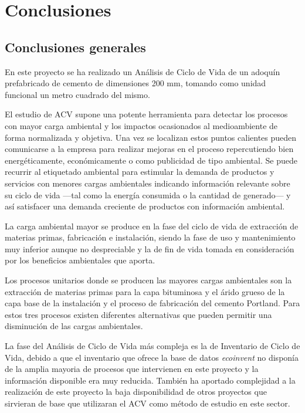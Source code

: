 \chapter{Conclusiones}\label{cap:conclusiones}
\section{Conclusiones generales}
En este proyecto se ha realizado un Análisis de Ciclo de Vida de un adoquín prefabricado de cemento de dimensiones 200 \si{mm}, tomando como unidad funcional un metro cuadrado del mismo.

El estudio de ACV supone una potente herramienta para detectar los procesos con mayor carga ambiental y los impactos ocasionados al medioambiente de forma normalizada y objetiva. Una vez se localizan estos puntos calientes pueden comunicarse a la empresa para realizar mejoras en el proceso repercutiendo bien energéticamente, económicamente o como publicidad de tipo ambiental. Se puede recurrir al etiquetado ambiental \cite{iso14020} para estimular la demanda de productos y servicios con menores cargas ambientales indicando información relevante sobre su ciclo de vida —tal como la energía consumida o la cantidad de  generado— y así satisfacer una demanda creciente de productos con información ambiental.

La carga ambiental mayor se produce en la fase del ciclo de vida de extracción de materias primas, fabricación e instalación, siendo la fase de uso y mantenimiento muy inferior aunque no despreciable y la de fin de vida tomada en consideración por los beneficios ambientales que aporta.

Los procesos unitarios donde se producen las mayores cargas ambientales son la extracción de materias primas para la capa bituminosa y el árido grueso de la capa base de la instalación y el proceso de fabricación del cemento Portland. Para estos tres procesos existen diferentes alternativas que pueden permitir una disminución de las cargas ambientales.

La fase del Análisis de Ciclo de Vida más compleja es la de Inventario de Ciclo de Vida, debido a que el inventario que ofrece la base de datos \textit{ecoinvent} no disponía de la amplia mayoria de procesos que intervienen en este proyecto y la información disponible era muy reducida. También ha aportado complejidad a la realización de este proyecto la baja disponibilidad de otros proyectos que sirvieran de base que utilizaran el ACV como método de estudio en este sector.

